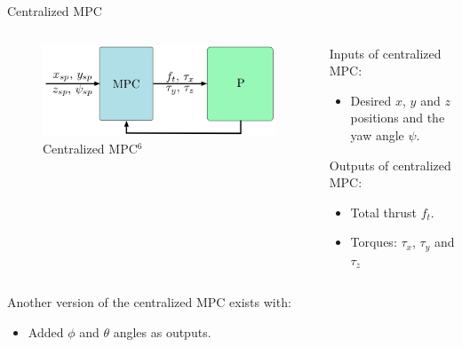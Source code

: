 \documentclass{thesisbeamer}
\newcommand\Fontvi{\fontsize{9}{10}\selectfont}
\begin{document}
\begin{frame}{Centralized MPC}
	\Fontvi

	\begin{columns}
		\begin{column}{0.5\textwidth}
			\begin{figure}
				\includegraphics[width=\textwidth]{Images/Control/centralized_mpc.png}
				\caption{Centralized MPC$^6$}
			\end{figure}
		\end{column}
		\begin{column}{0.5\textwidth}
			Inputs of centralized MPC:
			\begin{itemize}
				\item Desired $x$, $y$ and $z$ positions and the yaw angle $\psi$.
			\end{itemize}
			Outputs of centralized MPC:
			\begin{itemize}
				\item Total thrust $f_t$.
				\item Torques: $\tau_x$, $\tau_y$ and $\tau_z$
			\end{itemize}
		\end{column}
	\end{columns}
	\vspace{1cm}
	Another version of the centralized MPC exists with:
	\begin{itemize}
		\item Added $\phi$ and $\theta$ angles as outputs.
	\end{itemize}
	
\end{frame}
\end{document}
